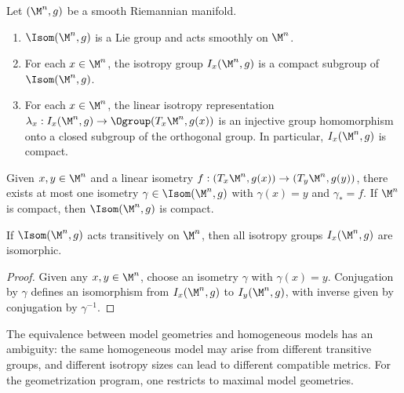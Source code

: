 \begin{proposition}
\label{ch01-prop-isometry-group}

Let $(\M^n,g)$ be a smooth Riemannian manifold.
\begin{enumerate}
\item $\Isom(\M^n,g)$ is a Lie group and acts smoothly on $\M^n$.
\item For each $x \in \M^n$, the isotropy group $I_x(\M^n,g)$ is a compact subgroup of $\Isom(\M^n,g)$.
\item For each $x \in \M^n$, the linear isotropy representation $\lambda_x : I_x(\M^n,g) \to \Ogroup(T_x \M^n, g(x))$ is an injective group homomorphism onto a closed subgroup of the orthogonal group. In particular, $I_x(\M^n,g)$ is compact.
\end{enumerate}
\end{proposition}

\begin{corollary}
\label{ch01-cor-unique-isometry}

Given $x,y \in \M^n$ and a linear isometry $f : (T_x \M^n,g(x)) \to (T_y \M^n,g(y))$, there exists at most one isometry $\gamma \in \Isom(\M^n,g)$ with $\gamma(x)=y$ and $\gamma_* = f$. If $\M^n$ is compact, then $\Isom(\M^n,g)$ is compact.
\end{corollary}

\begin{lemma}
\label{ch01-lem-isotropy-isomorphic}

If $\Isom(\M^n,g)$ acts transitively on $\M^n$, then all isotropy groups $I_x(\M^n,g)$ are isomorphic.
\end{lemma}

\begin{proof}
\sketch Given any $x,y \in \M^n$, choose an isometry $\gamma$ with $\gamma(x)=y$. Conjugation by $\gamma$ defines an isomorphism from $I_x(\M^n,g)$ to $I_y(\M^n,g)$, with inverse given by conjugation by $\gamma^{-1}$.
\end{proof}

\begin{remark}
\label{ch01-rem-model-geometry-ambiguity}

The equivalence between model geometries and homogeneous models has an ambiguity: the same homogeneous model may arise from different transitive groups, and different isotropy sizes can lead to different compatible metrics. For the geometrization program, one restricts to maximal model geometries.
\end{remark}

